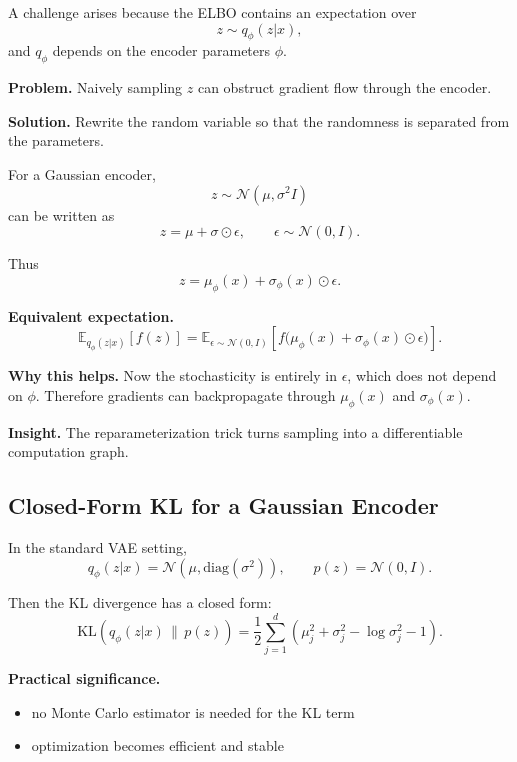 A challenge arises because the ELBO contains an expectation over
\[
z \sim q_\phi(z|x),
\]
and $q_\phi$ depends on the encoder parameters $\phi$.

\medskip

\noindent
\textbf{Problem.}  
Naively sampling $z$ can obstruct gradient flow through the encoder.

\medskip

\noindent
\textbf{Solution.}  
Rewrite the random variable so that the randomness is separated from the parameters.

For a Gaussian encoder,
\[
z \sim \mathcal{N}(\mu,\sigma^2 I)
\]
can be written as
\[
z = \mu + \sigma \odot \epsilon,
\qquad
\epsilon \sim \mathcal{N}(0,I).
\]

Thus
\[
z = \mu_\phi(x) + \sigma_\phi(x)\odot \epsilon.
\]

\medskip

\noindent
\textbf{Equivalent expectation.}
\[
\mathbb{E}_{q_\phi(z|x)}[f(z)]
=
\mathbb{E}_{\epsilon \sim \mathcal{N}(0,I)}
\left[
f\bigl(\mu_\phi(x)+\sigma_\phi(x)\odot \epsilon\bigr)
\right].
\]

\medskip

\noindent
\textbf{Why this helps.}  
Now the stochasticity is entirely in $\epsilon$, which does not depend on $\phi$. Therefore gradients can backpropagate through $\mu_\phi(x)$ and $\sigma_\phi(x)$.

\medskip

\noindent
\textbf{Insight.}  
The reparameterization trick turns sampling into a differentiable computation graph.

\subsection{Closed-Form KL for a Gaussian Encoder}

In the standard VAE setting,
\[
q_\phi(z|x)=\mathcal{N}(\mu,\mathrm{diag}(\sigma^2)),
\qquad
p(z)=\mathcal{N}(0,I).
\]

Then the KL divergence has a closed form:
\[
\mathrm{KL}\!\left(q_\phi(z|x)\,\|\,p(z)\right)
=
\frac{1}{2}\sum_{j=1}^d
\left(
\mu_j^2+\sigma_j^2-\log \sigma_j^2 -1
\right).
\]

\medskip

\noindent
\textbf{Practical significance.}

\begin{itemize}
    \item no Monte Carlo estimator is needed for the KL term
    \item optimization becomes efficient and stable
\end{itemize}

